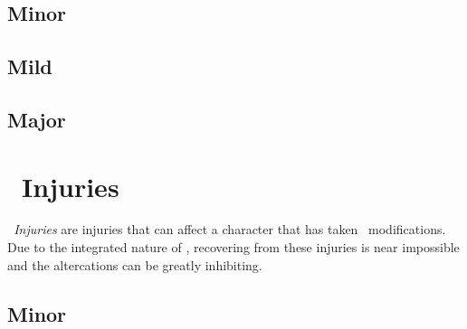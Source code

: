 \subsection{Minor}
\begin{multicols}{2}

\end{multicols}
\subsection{Mild}
\begin{multicols}{2}

\end{multicols}
\subsection{Major}
\begin{multicols}{2}

\end{multicols}

\section{\biot\ Injuries}\label{sec:bio_injuries}
\emph{\biot\ Injuries} are injuries that can affect a character that has taken \biot\ modifications. Due to the integrated nature of \biot , recovering from these injuries is near impossible and the altercations can be greatly inhibiting.
 
\subsection{Minor}
\begin{multicols}{2}

\end{multicols}
